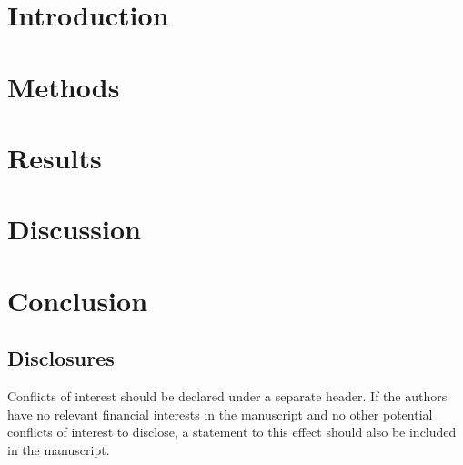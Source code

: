 \documentclass[12pt]{spieman}
\begin{document}
\begin{spacing}{2}


\section{Introduction}
\label{sect:introduction}


\section{Methods}
\label{sect:methods}


\section{Results}
\label{sect:results}


\section{Discussion}
\label{sect:discussion}


\section{Conclusion}
\label{sect:conclusion}


\subsection*{Disclosures}
Conflicts of interest should be declared under a separate header. If the authors have no relevant financial interests in the manuscript and no other potential conflicts of interest to disclose, a statement to this effect should also be included in the manuscript.


\end{spacing}
\end{document}
